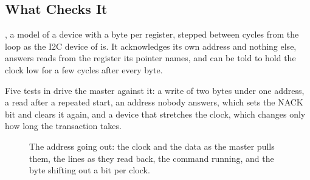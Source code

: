 \subsection{What Checks It}

, a model of a device with a byte per register, stepped
between cycles from the loop as the I2C device of 
is. It acknowledges its own address and nothing else, answers reads
from the register its pointer names, and can be told to hold the clock
low for a few cycles after every byte.

Five tests in  drive the master against
it: a write of two bytes under one address, a read after a repeated
start, an address nobody answers, which sets the NACK bit and clears
it again, and a device that stretches the clock, which changes only
how long the transaction takes.

\begin{figure}[htbp]
\centering

\caption{The address going out: the clock and the data as the master
pulls them, the lines as they read back, the command running, and the
byte shifting out a bit per clock.}
\label{fig:x-i2c}
\end{figure}




